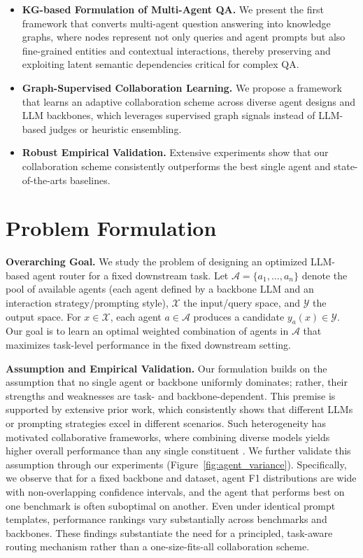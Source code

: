 \documentclass[11pt]{article}
\begin{document}
\begin{itemize}
    \item\textbf{KG-based Formulation of Multi-Agent QA.} We present the first framework that converts multi-agent question answering into knowledge graphs, where nodes represent not only queries and agent prompts but also fine-grained entities and contextual interactions, thereby preserving and exploiting latent semantic dependencies critical for complex QA.
    \item\textbf{Graph-Supervised Collaboration Learning.} We propose a framework that learns an adaptive collaboration scheme across diverse agent designs and  LLM backbones, which leverages supervised graph signals instead of LLM-based judges or heuristic ensembling.
    \item\textbf{Robust Empirical Validation.} Extensive experiments show that our collaboration scheme consistently outperforms the best single agent and state-of-the-arts baselines.
\end{itemize}



\section{Problem Formulation}

\noindent\textbf{Overarching Goal. }We study the problem of designing an optimized LLM-based agent router for a fixed downstream task. Let $\mathcal{A}=\{a_1,\ldots,a_n\}$ denote the pool of available agents (each agent defined by a backbone LLM and an interaction strategy/prompting style), $\mathcal{X}$ the input/query space, and $\mathcal{Y}$ the output space. For $x\in\mathcal{X}$, each agent $a\in\mathcal{A}$ produces a candidate $y_a(x)\in\mathcal{Y}$. Our goal is to learn an optimal weighted combination of agents in $\mathcal{A}$ that maximizes task-level performance in the fixed downstream setting.  

\noindent\textbf{Assumption and Empirical Validation. }Our formulation builds on the assumption that no single agent or backbone uniformly dominates; rather, their strengths and weaknesses are task- and backbone-dependent. This premise is supported by extensive prior work, which consistently shows that different LLMs or prompting strategies excel in different scenarios. Such heterogeneity has motivated collaborative frameworks, where combining diverse models yields higher overall performance than any single constituent \citep{chen2024agentverse, chen2024reconcile}. We further validate this assumption through our experiments (Figure~\ref{fig:agent_variance}). Specifically, we observe that for a fixed backbone and dataset, agent F1 distributions are wide with non-overlapping confidence intervals, and the agent that performs best on one benchmark is often suboptimal on another. Even under identical prompt templates, performance rankings vary substantially across benchmarks and backbones. These findings substantiate the need for a principled, task-aware routing mechanism rather than a one-size-fits-all collaboration scheme.
\end{document}
